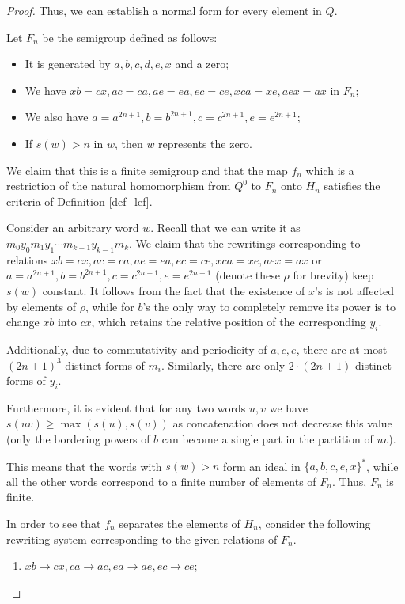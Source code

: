 \documentclass[10pt,a4paper]{amsart}
\begin{document}
\begin{proof}
Thus, we can establish a normal form for every element in $Q$.

Let $F_n$ be the semigroup defined as follows:

\begin{itemize}
\item It is generated by $a,b,c,d,e,x$ and a zero;
\item We have $xb = cx, ac = ca, ae=ea, ec=ce, xca = xe, aex = ax$ in $F_n$;
\item We also have $a = a^{2n+1}, b = b^{2n+1}, c=c^{2n+1}, e=e^{2n+1}$;
\item If  $s(w)>n$ in $w$, then $w$ represents the zero.
\end{itemize}

We claim that this is a finite semigroup and that the map $f_n$ which is a restriction of the natural homomorphism from $Q^{0}$ to $F_n$ onto $H_n$ satisfies the criteria of Definition \ref{def_lef}.

Consider an arbitrary word $w$. Recall that we can write it as  $m_0 y_0 m_1 y_1 \cdots m_{k-1} y_{k-1} m_k$. We claim that the rewritings corresponding to relations $xb = cx, ac = ca, ae=ea, ec=ce, xca = xe, aex = ax$ or $a = a^{2n+1}, b = b^{2n+1}, c=c^{2n+1}, e=e^{2n+1}$ (denote these $\rho$ for brevity) keep $s(w)$ constant. It follows from the fact that the existence of $x$'s is not affected by elements of $\rho$, while for $b$'s the only way to completely remove its power is to change $xb$ into $cx$, which retains the relative position of the corresponding $y_i$.

Additionally, due to commutativity and periodicity of $a,c,e$, there are at most $(2n+1)^3$ distinct forms of $m_i$. Similarly, there are only $2 \cdot (2n+1)$ distinct forms of $y_i$.

Furthermore, it is evident that for any two words $u,v$ we have $s(uv) \ge \max (s(u) , s(v))$ as concatenation does not decrease this value (only the bordering powers of $b$ can become a single part in the partition of $uv$).

This means that the words with $s(w) > n$ form an ideal in $\{a,b,c,e,x\}^*$, while all the other words correspond to a finite number of elements of $F_n$. Thus, $F_n$ is finite.

In order to see that $f_n$ separates the elements of $H_n$, consider the following rewriting system corresponding to the given relations of $F_n$.

\begin{enumerate}
\item $xb \rightarrow cx, ca \rightarrow ac, ea \rightarrow ae, ec \rightarrow ce$;



\end{enumerate}
\end{proof}
\end{document}
